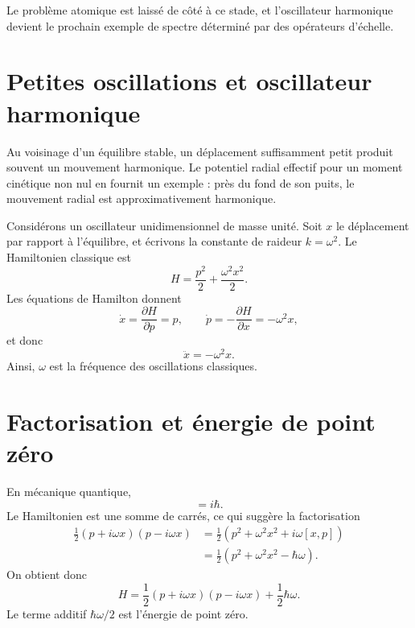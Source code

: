 \begin{classroomqa}\end{classroomqa}

Le problème atomique est laissé de côté à ce stade, et l’oscillateur harmonique devient le prochain exemple de spectre déterminé par des opérateurs d’échelle.

\section{Petites oscillations et oscillateur harmonique}

Au voisinage d’un équilibre stable, un déplacement suffisamment petit produit souvent un mouvement harmonique. Le potentiel radial effectif pour un moment cinétique non nul en fournit un exemple : près du fond de son puits, le mouvement radial est approximativement harmonique.

Considérons un oscillateur unidimensionnel de masse unité. Soit \(x\) le déplacement par rapport à l’équilibre, et écrivons la constante de raideur \(k=\omega^2\). Le Hamiltonien classique est
\begin{equation}
H=\frac{p^2}{2}+\frac{\omega^2x^2}{2}.
\end{equation}
Les équations de Hamilton donnent
\begin{equation}
\dot{x}=\frac{\partial H}{\partial p}=p,
\qquad
\dot{p}=-\frac{\partial H}{\partial x}=-\omega^2x,
\end{equation}
et donc
\begin{equation}
\ddot{x}=-\omega^2x.
\end{equation}
Ainsi, \(\omega\) est la fréquence des oscillations classiques.

\section{Factorisation et énergie de point zéro}

En mécanique quantique,
\begin{equation}
[x,p]=i\hbar.
\end{equation}
Le Hamiltonien est une somme de carrés, ce qui suggère la factorisation
\begin{align}
\frac{1}{2}(p+i\omega x)(p-i\omega x)
&=\frac{1}{2}\left(p^2+\omega^2x^2+i\omega[x,p]\right) \\
&=\frac{1}{2}\left(p^2+\omega^2x^2-\hbar\omega\right).
\end{align}
On obtient donc
\begin{equation}
H=\frac{1}{2}(p+i\omega x)(p-i\omega x)
+\frac{1}{2}\hbar\omega.
\end{equation}
Le terme additif \(\hbar\omega/2\) est l’énergie de point zéro.


